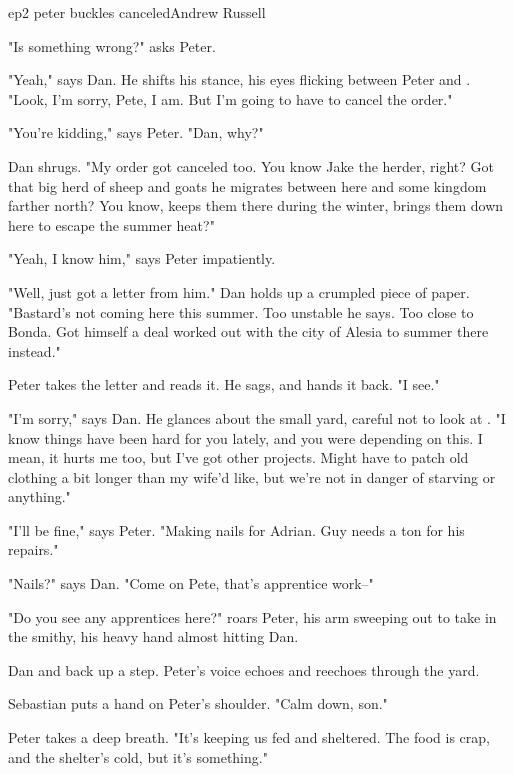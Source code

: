 \documentclass{book}
\begin{document}
\begin{childnode}{ep2 peter buckles canceled}{Andrew Russell}

    
    "Is something wrong?" asks Peter. 

    "Yeah," says Dan. He shifts his stance, his eyes flicking between Peter and \name{}. "Look, I'm sorry, Pete, I am. But I'm going to have to cancel the order."
    
    "You're kidding," says Peter. "Dan, why?"

    Dan shrugs. "My order got canceled too. You know Jake the herder, right? Got that big herd of sheep and goats he migrates between here and some kingdom farther north? You know, keeps them there during the winter, brings them down here to escape the summer
    heat?"

    "Yeah, I know him," says Peter impatiently.

    "Well, just got a letter from him." Dan holds up a crumpled piece of paper. "Bastard's not coming here this summer. Too unstable he says. Too close to Bonda. Got himself a deal worked out with 
    the city of Alesia to summer there instead." 

    Peter takes the letter and reads it. He sags, and hands it back. "I see."

    "I'm sorry," says Dan. He glances about the small yard, careful not to look at \name{}. "I know things have been hard for you lately, and you were depending on this. I mean, it hurts me too, but I've got other projects. Might have to patch old clothing a bit
    longer than my wife'd like, but we're not in danger of starving or anything."

    "I'll be fine," says Peter. "Making nails for Adrian. Guy needs a ton for his repairs."

    "Nails?" says Dan. "Come on Pete, that's apprentice work--"

    "Do you see any apprentices here?" roars Peter, his arm sweeping out to take in the smithy, his heavy hand almost hitting Dan.

    Dan and \name{} back up a step. Peter's voice echoes and reechoes through the yard. 
    
    Sebastian puts a hand on Peter's shoulder. "Calm down, son."

    Peter takes a deep breath. "It's keeping us fed and sheltered. The food is crap, and the shelter's cold, but it's something."


\end{childnode}
\end{document}
